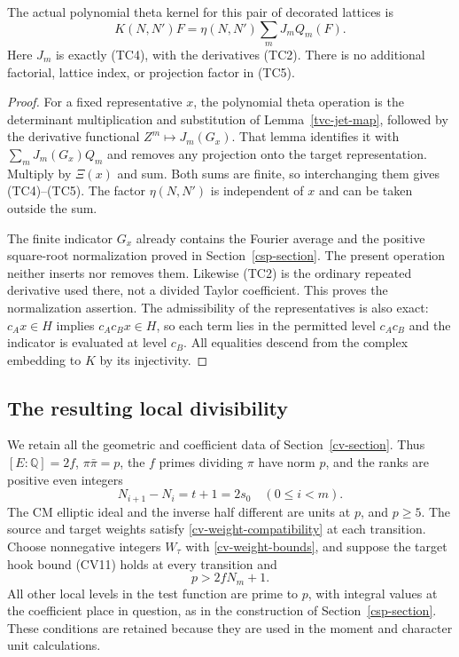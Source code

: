 \begin{proposition}\label{tvc-actual-kernel}
The actual polynomial theta kernel for this pair of decorated
lattices is
\[
                  K(N,N')F=\eta(N,N')\sum_m J_mQ_m(F).
                                                               \tag{TC5}
\]
Here $J_m$ is exactly (TC4), with the derivatives (TC2).
There is no additional factorial, lattice index, or projection
factor in (TC5).
\end{proposition}
\begin{proof}
For a fixed representative $x$, the polynomial theta operation is
the determinant multiplication and substitution of Lemma~\ref{tvc-jet-map},
followed by the derivative functional $Z^m\mapsto J_m(G_x)$.
That lemma identifies it with $\sum_mJ_m(G_x)Q_m$ and removes
any projection onto the target representation. Multiply by
$\Xi(x)$ and sum. Both sums are finite, so interchanging them
gives (TC4)--(TC5). The factor $\eta(N,N')$ is independent of $x$
and can be taken outside the sum.

The finite indicator $G_x$ already contains the Fourier average
and the positive square-root normalization proved in
Section~\ref{csp-section}. The present operation neither inserts
nor removes them. Likewise (TC2) is the ordinary repeated
derivative used there, not a divided Taylor coefficient.
This proves the normalization assertion. The admissibility of
the representatives is also exact: $c_Ax\in H$ implies
$c_Ac_Bx\in H$, so each term lies in the permitted level
$c_Ac_B$ and the indicator is evaluated at level $c_B$.
All equalities descend from the complex embedding to $K$ by
its injectivity.
\end{proof}

\subsection{The resulting local divisibility}

We retain all the geometric and coefficient data of
Section~\ref{cv-section}. Thus $[E:\mathbb Q]=2f$,
$\pi\bar\pi=p$, the $f$ primes dividing $\pi$ have norm $p$,
and the ranks are positive even integers
\[
                 N_{i+1}-N_i=t+1=2s_0\quad(0\le i<m).
\]
The CM elliptic ideal and the inverse half different are units at
$p$, and $p\ge5$. The source and target weights satisfy
\eqref{cv-weight-compatibility} at each transition. Choose
nonnegative integers $W_\tau$ with \eqref{cv-weight-bounds}, and suppose the
target hook bound \textup{(CV11)} holds at every transition and
\[
                              p>2fN_m+1.                       \tag{TC6}
\]
All other local levels in the test function are prime to $p$,
with integral values at the coefficient place in question, as in
the construction of Section~\ref{csp-section}. These conditions
are retained because they are used in the moment and character
unit calculations.

